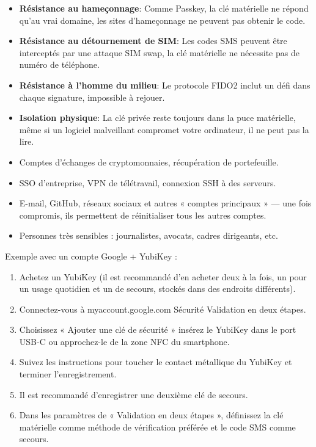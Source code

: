 \begin{itemize}
  \item \textbf{Résistance au hameçonnage}: Comme Passkey, la clé matérielle ne répond qu'au vrai domaine, les sites d'hameçonnage ne peuvent pas obtenir le code.
  \item \textbf{Résistance au détournement de SIM}: Les codes SMS peuvent être interceptés par une attaque SIM swap, la clé matérielle ne nécessite pas de numéro de téléphone.
  \item \textbf{Résistance à l'homme du milieu}: Le protocole FIDO2 inclut un défi dans chaque signature, impossible à rejouer.
  \item \textbf{Isolation physique}: La clé privée reste toujours dans la puce matérielle, même si un logiciel malveillant compromet votre ordinateur, il ne peut pas la lire.
\end{itemize}


\begin{itemize}
  \item Comptes d'échanges de cryptomonnaies, récupération de portefeuille.
  \item SSO d'entreprise, VPN de télétravail, connexion SSH à des serveurs.
  \item E-mail, GitHub, réseaux sociaux et autres « comptes principaux » — une fois compromis, ils permettent de réinitialiser tous les autres comptes.
  \item Personnes très sensibles : journalistes, avocats, cadres dirigeants, etc.
\end{itemize}


Exemple avec un compte Google + YubiKey :

\begin{enumerate}
  \item Achetez un YubiKey (il est recommandé d'en acheter deux à la fois, un pour un usage quotidien et un de secours, stockés dans des endroits différents).
  \item Connectez-vous à myaccount.google.com Sécurité Validation en deux étapes.
  \item Choisissez « Ajouter une clé de sécurité » insérez le YubiKey dans le port USB-C ou approchez-le de la zone NFC du smartphone.
  \item Suivez les instructions pour toucher le contact métallique du YubiKey et terminer l'enregistrement.
  \item Il est recommandé d'enregistrer une deuxième clé de secours.
  \item Dans les paramètres de « Validation en deux étapes », définissez la clé matérielle comme méthode de vérification préférée et le code SMS comme secours.
\end{enumerate}

